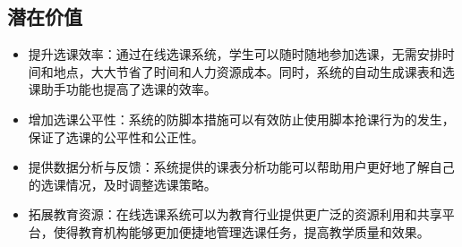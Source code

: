 \documentclass{article}
\begin{document}
\subsection{潜在价值}
\begin{itemize}
	\item 提升选课效率：通过在线选课系统，学生可以随时随地参加选课，无需安排时间和地点，大大节省了时间和人力资源成本。同时，系统的自动生成课表和选课助手功能也提高了选课的效率。
	\item 增加选课公平性：系统的防脚本措施可以有效防止使用脚本抢课行为的发生，保证了选课的公平性和公正性。
	\item 提供数据分析与反馈：系统提供的课表分析功能可以帮助用户更好地了解自己的选课情况，及时调整选课策略。
	\item 拓展教育资源：在线选课系统可以为教育行业提供更广泛的资源利用和共享平台，使得教育机构能够更加便捷地管理选课任务，提高教学质量和效果。
\end{itemize}
\end{document}
